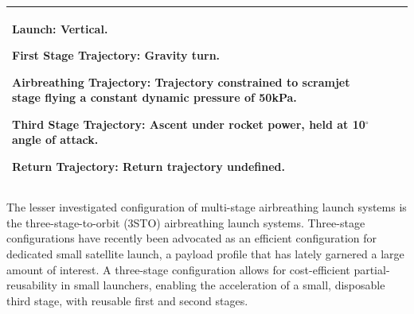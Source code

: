 {\begin{landscape}
\begin{xltabular}{\linewidth}{|X|X|X|}
	
	\textbf{Launch:} Vertical.
	
	\textbf{First Stage Trajectory:} Gravity turn. 
	
	\textbf{Airbreathing Trajectory:} Trajectory constrained to scramjet stage flying a constant dynamic pressure of 50kPa. 
	
	\textbf{Third Stage Trajectory:} Ascent under rocket power, held at 10$^\circ$ angle of attack. 
	
	\textbf{Return Trajectory:} Return trajectory undefined. 
	
	\\
	\hline
\end{xltabular}

\end{landscape}
}
\noindent
The lesser investigated configuration of multi-stage airbreathing launch systems is the three-stage-to-orbit (3STO) airbreathing launch systems. Three-stage configurations have recently been advocated as an efficient configuration for dedicated small satellite launch, a payload profile that has lately garnered a large amount of interest\cite{Preller2017b,Faa&Ast&Comstac2015}. A three-stage configuration allows for cost-efficient partial-reusability in small launchers, enabling the acceleration of a small, disposable third stage, with reusable first and second stages\cite{Preller2017b,Kimura1999}. 
